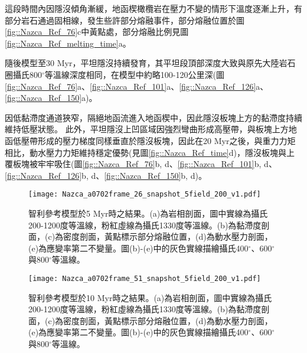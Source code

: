 
這段時間內因隱沒傾角漸緩，地函楔橄欖岩在壓力不變的情形下溫度逐漸上升，有部分岩石通過固相線，發生些許部分熔融事件，部分熔融位置於圖\ref{fig::Nazca_Ref_76}c中黃點處，部分熔融比例見圖\ref{fig::Nazca_Ref_melting_time}a。

隨後模型至30 Myr，平坦隱沒持續發育，其平坦段頂部深度大致與原先大陸岩石圈攝氏800$^{\circ}$等溫線深度相同，在模型中約略100-120公里深(圖\ref{fig::Nazca_Ref_76}a、\ref{fig::Nazca_Ref_101}a、\ref{fig::Nazca_Ref_126}a、\ref{fig::Nazca_Ref_150}a)。

因低黏滯度通道狹窄，隔絕地函流進入地函楔中，因此隱沒板塊上方的黏滯度持續維持低壓狀態。
此外，平坦隱沒上凹區域因強烈彎曲形成高壓帶，與板塊上方地函低壓帶形成的壓力梯度同樣垂直於隱沒板塊，因此在20 Myr之後，與重力力矩相比，動水壓力力矩維持穩定優勢(見圖\ref{fig::Nazca_Ref_time}d)，隱沒板塊與上覆板塊被牢牢吸住(圖\ref{fig::Nazca_Ref_76}b, d、\ref{fig::Nazca_Ref_101}b, d、\ref{fig::Nazca_Ref_126}b, d、\ref{fig::Nazca_Ref_150}b, d)。


\begin{figure*}[htp]
    \centering
    \texttt{[image: Nazca\_a0702frame\_26\_snapshot\_5field\_200\_v1.pdf]}
    \caption[智利參考模型於5 Myr時之結果]{智利參考模型於5 Myr時之結果。(a)為岩相剖面，圖中實線為攝氏200-1200度等溫線，粉紅虛線為攝氏1330度等溫線。(b)為黏滯度剖面，(c)為密度剖面，黃點標示部分熔融位置，(d)為動水壓力剖面，(e)為應變率第二不變量。圖(b)-(e)中的灰色實線描繪攝氏400$^{\circ}$、600$^{\circ}$與800$^{\circ}$等溫線。}
    \label{fig::Nazca_Ref_26}
\end{figure*}

\begin{figure*}[htp]
    \centering
    \texttt{[image: Nazca\_a0702frame\_51\_snapshot\_5field\_200\_v1.pdf]}
    \caption[智利參考模型於10 Myr時之結果]{智利參考模型於10 Myr時之結果。(a)為岩相剖面，圖中實線為攝氏200-1200度等溫線，粉紅虛線為攝氏1330度等溫線。(b)為黏滯度剖面，(c)為密度剖面，黃點標示部分熔融位置，(d)為動水壓力剖面，(e)為應變率第二不變量。圖(b)-(e)中的灰色實線描繪攝氏400$^{\circ}$、600$^{\circ}$與800$^{\circ}$等溫線。}
    \label{fig::Nazca_Ref_51}
\end{figure*}


